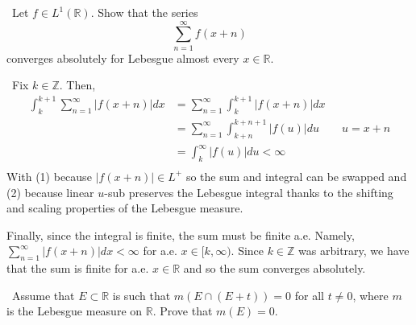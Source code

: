 \documentclass[12pt]{Homework}
\begin{document}
\newpage




\begin{problem} $\,$
Let $f\in L^1(\mathbb{R})$. Show that the series $$\sum_{n=1}^\infty f(x+n)$$ converges absolutely for Lebesgue almost every $x\in \mathbb{R}.$
\end{problem}


\begin{solution}$\,$
Fix $k\in\mathbb{Z}$. Then,
 \begin{align*}
     \int_k^{k+1}\sum_{n=1}^\infty|f(x+n)|dx&=\sum_{n=1}^\infty\int_k^{k+1}|f(x+n)|dx\tag{1}\\
     &=\sum_{n=1}^\infty\int_{k+n}^{k+n+1}|f(u)|du\qquad u=x+n\tag{2}\\
     &=\int_k^\infty|f(u)|du<\infty\\
 \end{align*}
 With (1) because $|f(x+n)|\in L^+$ so the sum and integral can be swapped and (2) because linear $u$-sub preserves the Lebesgue integral thanks to the shifting and scaling properties of the Lebesgue measure.
 
 Finally, since the integral is finite, the sum must be finite a.e. Namely, $\displaystyle\sum_{n=1}^\infty|f(x+n)|dx<\infty$ for a.e. $x\in[k,\infty)$. Since $k\in\mathbb{Z}$ was arbitrary, we have that the sum is finite for a.e. $x\in\mathbb{R}$ and so the sum converges absolutely.
\end{solution}
\newpage




\begin{problem} $\,$
Assume that $E\subset\mathbb{R}$ is such that $m(E\cap (E+t))=0$ for all $t\not=0$, where $m$ is the Lebesgue measure on $\mathbb{R}.$ Prove that $m(E)=0.$
\end{problem}
\end{document}
